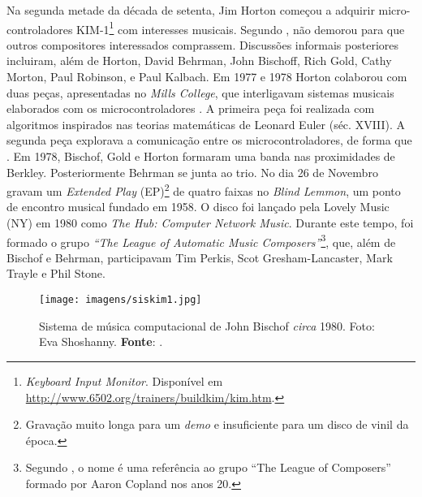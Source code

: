 Na segunda metade da década de setenta, Jim Horton começou a adquirir micro-controladores KIM-1\footnote{\emph{Keyboard Input Monitor}. Disponível em \url{http://www.6502.org/trainers/buildkim/kim.htm}.} com interesses musicais. Segundo , não demorou para que outros compositores interessados comprassem. Discussões informais posteriores incluiram, além de Horton, David Behrman, John Bischoff, Rich Gold, Cathy Morton, Paul Robinson, e Paul Kalbach. Em 1977 e 1978  Horton colaborou com duas peças, apresentadas no \emph{Mills College}, que interligavam sistemas musicais elaborados com os microcontroladores . A primeira peça foi realizada com algoritmos inspirados nas teorias matemáticas de Leonard Euler (séc. XVIII). A segunda peça explorava a comunicação entre os microcontroladores, de forma que . Em 1978, Bischof, Gold e Horton formaram uma banda nas proximidades de Berkley. Posteriormente Behrman se junta ao trio. No dia 26 de Novembro gravam um \emph{Extended Play} (EP)\footnote{Gravação muito longa para um \emph{demo} e insuficiente para um disco de vinil da época.} de quatro faixas no \emph{Blind Lemmon}, um ponto de encontro musical fundado em 1958. O disco foi lançado pela Lovely Music (NY) em 1980 como \emph{The Hub: Computer Network Music}.  Durante este tempo, foi formado o grupo \emph{``The League of Automatic Music Composers''}\footnote{Segundo , o nome é uma referência ao grupo ``The League of Composers'' formado por Aaron Copland nos anos 20.}, que, além de  Bischof e Behrman, participavam Tim Perkis, Scot Gresham-Lancaster, Mark Trayle e Phil Stone. 

\begin{figure}[!h]
  \centering
  \texttt{[image: imagens/siskim1.jpg]}
  \caption{Sistema de música computacional de John Bischof \emph{circa} 1980. Foto: Eva Shoshanny\protect\footnotemark. \textbf{Fonte}: .}
  \label{fig:siskim1}
\end{figure}


